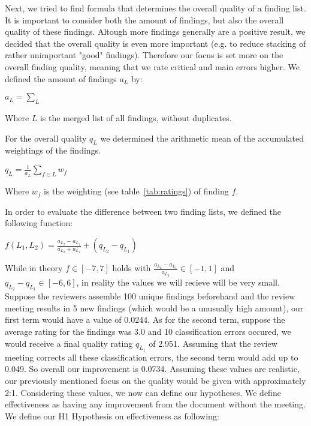 Next, we tried to find formula that determines the overall quality of a finding list. It is important to consider both the amount of findings, but also the overall quality of these findings. Altough more findings generally are a positive result, we decided that the overall quality is even more important (e.g. to reduce stacking of rather unimportant "good" findings). Therefore our focus is set more on the overall finding quality, meaning that we rate critical and main errors higher.
We defined the amount of findings $a_L$ by:
\begin{center}

$a_L = \sum_{L}$
\end{center}

Where $L$ is the merged list of all findings, without duplicates.

For the overall quality $q_L$ we determined the arithmetic mean of the accumulated weightings of the findings.

\begin{center}
{$q_L = \frac{1}{a_L} \sum_{f \in L} w_f$}
\end{center}

Where $w_f$ is the weighting (see table~\ref{tab:ratings}) of finding $f$.

In order to evaluate the difference between two finding lists, we defined the following function:

\begin{center}
$f(L_1, L_2) = \frac{a_{L_2} - a_{L_1}}{a_{L_2} + a_{L_1}} + (q_{L_2} - q_{L_1}) $
\end{center}

While in theory $f \in [-7, 7]$ holds with $\frac{a_{L_2} - a_{L_1}}{a_{L_2}} \in [-1, 1]$ and $q_{L_2} - q_{L_1} \in [-6, 6]$, in reality the values we will recieve will be very small. Suppose the reviewers assemble 100 unique findings beforehand and the review meeting results in 5 new findings (which would be a unusually high amount), our first term
would have a value of 0.0244.
As for the second term, suppose the average rating for the findings was 3.0 and 10 classification errors occured, we would receive a final quality rating $q_{L_1}$ of 2.951. Assuming that the review meeting corrects all these classification errors, the second term would add up to 0.049. So overall our improvement is 0.0734. Assuming these values are realistic, our previously mentioned focus on the quality would be given with approximately 2:1.
Considering these values, we now can define our hypotheses.
We define effectiveness as having any improvement from the document without the meeting.
We define our H1 Hypothesis on effectiveness as following:

